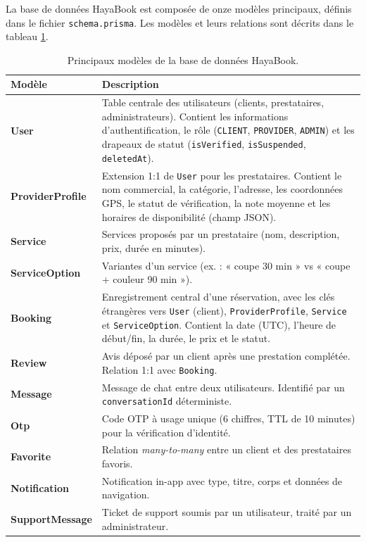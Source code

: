 La base de données HayaBook est composée de onze modèles principaux, définis dans le fichier \texttt{schema.prisma}. Les modèles et leurs relations sont décrits dans le tableau \ref{tab:models}.

\begin{table}[h]
\centering
\caption{Principaux modèles de la base de données HayaBook.}
\label{tab:models}
\begin{tabular}{|l|p{9cm}|}
\hline
\textbf{Modèle} & \textbf{Description} \\
\hline
\textbf{User} & Table centrale des utilisateurs (clients, prestataires, administrateurs). Contient les informations d'authentification, le rôle (\texttt{CLIENT}, \texttt{PROVIDER}, \texttt{ADMIN}) et les drapeaux de statut (\texttt{isVerified}, \texttt{isSuspended}, \texttt{deletedAt}). \\
\hline
\textbf{ProviderProfile} & Extension 1:1 de \texttt{User} pour les prestataires. Contient le nom commercial, la catégorie, l'adresse, les coordonnées GPS, le statut de vérification, la note moyenne et les horaires de disponibilité (champ JSON). \\
\hline
\textbf{Service} & Services proposés par un prestataire (nom, description, prix, durée en minutes). \\
\hline
\textbf{ServiceOption} & Variantes d'un service (ex. : « coupe 30 min » vs « coupe + couleur 90 min »). \\
\hline
\textbf{Booking} & Enregistrement central d'une réservation, avec les clés étrangères vers \texttt{User} (client), \texttt{ProviderProfile}, \texttt{Service} et \texttt{ServiceOption}. Contient la date (UTC), l'heure de début/fin, la durée, le prix et le statut. \\
\hline
\textbf{Review} & Avis déposé par un client après une prestation complétée. Relation 1:1 avec \texttt{Booking}. \\
\hline
\textbf{Message} & Message de chat entre deux utilisateurs. Identifié par un \texttt{conversationId} déterministe. \\
\hline
\textbf{Otp} & Code OTP à usage unique (6 chiffres, TTL de 10 minutes) pour la vérification d'identité. \\
\hline
\textbf{Favorite} & Relation \textit{many-to-many} entre un client et des prestataires favoris. \\
\hline
\textbf{Notification} & Notification in-app avec type, titre, corps et données de navigation. \\
\hline
\textbf{SupportMessage} & Ticket de support soumis par un utilisateur, traité par un administrateur. \\
\hline
\end{tabular}
\end{table}


